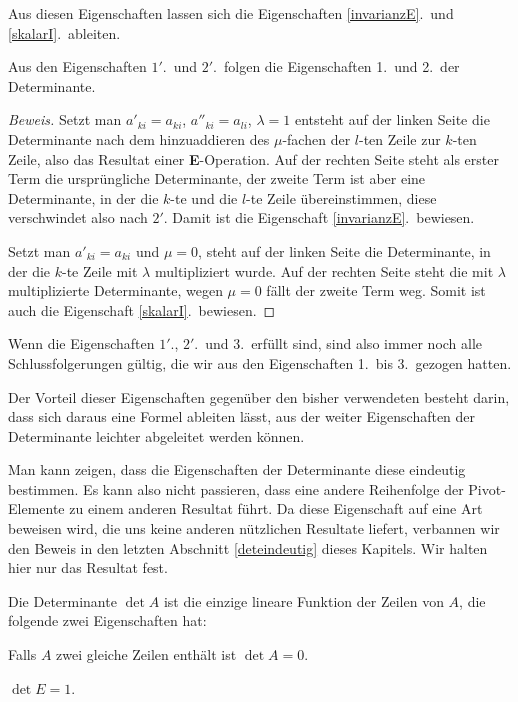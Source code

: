Aus diesen Eigenschaften lassen sich die Eigenschaften \ref{invarianzE}.~und
\ref{skalarI}.~ableiten.

\begin{hilfssatz} Aus den Eigenschaften $1'$.~und $2'$.~folgen die Eigenschaften
1.~und 2.~der Determinante.
\end{hilfssatz}
\begin{proof}[Beweis]
Setzt man 
$a'_{ki}=a_{ki}$, $a''_{ki}=a_{li}$, $\lambda=1$ entsteht auf der linken Seite
die Determinante nach dem hinzuaddieren des $\mu$-fachen der $l$-ten Zeile
zur $k$-ten Zeile, also das Resultat einer {\bf E}-Operation.
Auf der rechten Seite steht als erster Term die ursprüngliche Determinante,
der zweite Term ist aber eine Determinante, in der die $k$-te und die
$l$-te Zeile übereinstimmen, diese verschwindet also nach $2'$.
Damit ist die Eigenschaft \ref{invarianzE}.~bewiesen.

Setzt man $a'_{ki}=a_{ki}$ und $\mu=0$, steht auf der linken Seite
die Determinante, in der die $k$-te Zeile mit $\lambda$ multipliziert
wurde.
Auf der rechten Seite steht die mit $\lambda$ multiplizierte
Determinante, wegen $\mu=0$ fällt der zweite Term weg.
Somit ist auch die Eigenschaft \ref{skalarI}.~bewiesen.
\end{proof}

Wenn die Eigenschaften $1'$., $2'$.~und 3.~erfüllt sind, sind also immer
noch alle Schlussfolgerungen gültig, die wir aus den Eigenschaften
1.~bis 3.~gezogen hatten.

Der Vorteil dieser Eigenschaften gegenüber den bisher verwendeten
besteht darin, dass sich daraus eine Formel ableiten lässt, aus
der weiter Eigenschaften der Determinante leichter abgeleitet
werden können. 

Man kann zeigen, dass die Eigenschaften der Determinante diese
eindeutig bestimmen.
Es kann also nicht passieren, dass eine andere
Reihenfolge der Pivot-Elemente zu einem anderen Resultat führt.
Da diese Eigenschaft auf eine Art beweisen wird, die uns keine
anderen nützlichen Resultate liefert, verbannen wir den Beweis
in den letzten Abschnitt \ref{deteindeutig} dieses Kapitels.
Wir halten hier nur das Resultat fest.

\begin{satz}
\label{detcharacterisation}
Die Determinante
$\det A$
ist die einzige lineare Funktion der Zeilen von $A$, die folgende zwei
Eigenschaften hat:
\begin{compactenum}
\item Falls $A$ zwei gleiche Zeilen enthält ist $\det A=0$.
\item $\det E = 1$.
\end{compactenum}
\end{satz}

